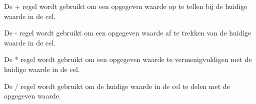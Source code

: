 \documentclass[11pt]{article}
\begin{document}
De + regel wordt gebruikt om een opgegeven waarde op te tellen bij de huidige waarde in de cel.
\begin{prooftree}
\end{prooftree}

\begin{prooftree}
\end{prooftree}

De - regel wordt gebruikt om een opgegeven waarde af te trekken van de huidige waarde in de cel.
\begin{prooftree}
\end{prooftree}

\begin{prooftree}
\end{prooftree}
De * regel wordt gebruikt om een opgegeven waarde te vermenigvuldigen met de huidige waarde in de cel.
\begin{prooftree}
\end{prooftree}

\begin{prooftree}
\end{prooftree}

De / regel wordt gebruikt om de huidige waarde in de cel te delen met de opgegeven waarde.
\begin{prooftree}
\end{prooftree}

\begin{prooftree}
\end{prooftree}
\end{document}
